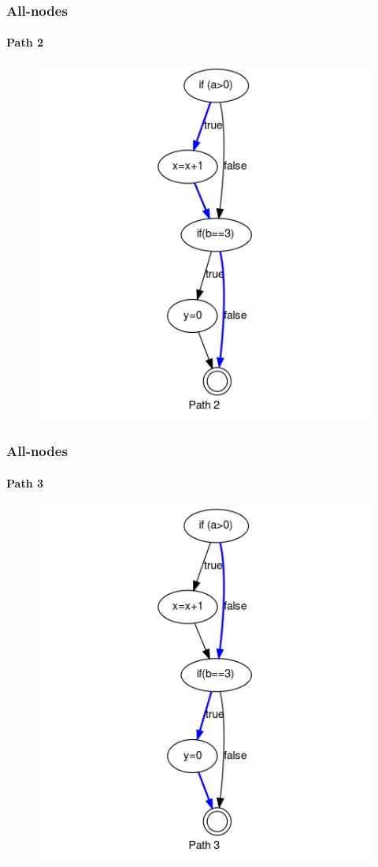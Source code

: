\begin{frame}[c]
\frametitle{All-nodes}
\framesubtitle{Path 2}

\begin{figure}
	\centering
	\includegraphics[scale=.3]{aux/examples/all-nodes/all-nodes-criterion-example-path-2}
\end{figure}
\end{frame}


\begin{frame}[c]
\frametitle{All-nodes}
\framesubtitle{Path 3}

\begin{figure}
	\centering
	\includegraphics[scale=.3]{aux/examples/all-nodes/all-nodes-criterion-example-path-3}
\end{figure}
\end{frame}



